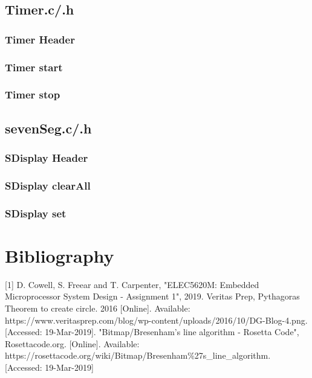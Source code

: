 \documentclass[a4paper,12pt]{article}
\newcommand{\TimerC}{../Timer/Timer.c}
\newcommand{\TimerH}{../Timer/Timer.h}
\newcommand{\sevenSegC}{../sevenSeg/sevenSeg.c}
\newcommand{\sevenSegH}{../sevenSeg/sevenSeg.h}
\begin{document}
\newpage
\subsection{Timer.c/.h}
\subsubsection{Timer Header}

\subsubsection{Timer start}

\subsubsection{Timer stop}


\newpage
\subsection{sevenSeg.c/.h}
\subsubsection{SDisplay Header}

\subsubsection{SDisplay clearAll}

\subsubsection{SDisplay set}

\newpage

\section{Bibliography}
[1] D. Cowell, S. Freear and T. Carpenter, "ELEC5620M: Embedded Microprocessor System Design - Assignment 1", 2019. \newline
[2] Veritas Prep, Pythagoras Theorem to create circle. 2016 [Online]. Available: \newline https://www.veritasprep.com/blog/wp-content/uploads/2016/10/DG-Blog-4.png. [Accessed: 19-Mar-2019]. \newline
[3]"Bitmap/Bresenham's line algorithm - Rosetta Code", Rosettacode.org. [Online]. Available: https://rosettacode.org/wiki/Bitmap/Bresenham\%27s\_line\_algorithm. [Accessed: 19-Mar-2019] \newline
\end{document}
